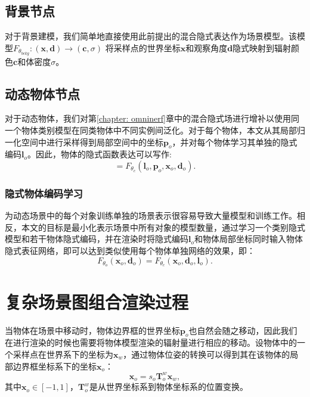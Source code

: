 \newcommand{\bgweight}{{\theta_{bckg}}}
\newcommand{\bgmodel}{F_{\bgweight}}
\newcommand{\classweight}{{\theta_{c}}}
\newcommand{\classmodel}{F_{\classweight}}
\newcommand{\xbf}{{\mathbf{x}}}
\newcommand{\dbf}{{\mathbf{d}}}
\newcommand{\cbf}{{\mathbf{c}}}
\newcommand{\po}{{\mathbf{p}_o}}
\newcommand{\latent}{{\mathbf{l}_o}}
\newcommand{\xo}{{\xbf_o}}
\newcommand{\dobj}{{\dbf_o}}
\newcommand{\xw}{{\xbf_w}}
\newcommand{\objpose}{\mathbf{T}_o^w}
\newcommand{\campose}{\mathbf{T}_c^w}
\newcommand{\ray}{{\mathbf{r}}}
\newcommand{\tobj}{{t_{o}}}
\newcommand{\tino}{{t_{o, in}}}
\newcommand{\touto}{{t_{o, out}}}
\newcommand{\tinw}{{t_{w, in}}}
\newcommand{\toutw}{{t_{w, out}}}

\subsection{背景节点}
对于背景建模，我们简单地直接使用此前提出的混合隐式表达作为场景模型。该模型$\bgmodel: (\xbf, \dbf) \to (\cbf, \sigma)$
将采样点的世界坐标$\xbf$和观察角度$\dbf$隐式映射到辐射颜色$\cbf$和体密度$\sigma$。

\subsection{动态物体节点}
对于动态物体，我们对第\ref{chapter: omninerf}章中的混合隐式场进行增补以使用同一个物体类别模型在同类物体中不同实例间泛化。对于每个物体，本文从其局部归一化空间中进行采样得到局部空间中的坐标$\po$，并对每个物体学习其单独的隐式编码$\latent$。因此，物体的隐式函数表达可以写作:
\begin{equation}
[\cbf(\xo), \sigma(\xo)] = \classmodel(\latent, \po, \xo, \dobj).
\end{equation}

\subsubsection{隐式物体编码学习}
为动态场景中的每个对象训练单独的场景表示很容易导致大量模型和训练工作。相反，本文的目标是最小化表示场景中所有对象的模型数量，通过学习一个类别隐式模型和若干物体隐式编码，并在渲染时将隐式编码$\latent$和物体局部坐标同时输入物体隐式表征网络，即可以达到类似使用每个物体单独网络的效果，即：
\begin{equation}
    F_{\theta_o}(\xo, \dobj) = \classmodel(\xo, \dobj, \latent).
\end{equation}

\section{复杂场景图组合渲染过程}
当物体在场景中移动时，物体边界框的世界坐标$\po$也自然会随之移动，因此我们在进行渲染的时候也需要将物体模型渲染的辐射量进行相应的移动。设物体中的一个采样点在世界系下的坐标为$\xw$，通过物体位姿的转换可以得到其在该物体的局部边界框坐标系下的坐标$\xo$：
\begin{equation}
    \xo = s_o\objpose\xw,
\end{equation}
其中$\xo\in[-1,1]$，$\objpose$是从世界坐标系到物体坐标系的位置变换。

